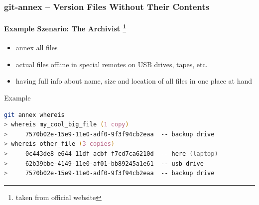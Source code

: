 \documentclass[english,hyperref={pdfpagelabels=false},aspectratio=169]{beamer}
\begin{document}
\begin{frame}[fragile]
  \frametitle{git-annex -- Version Files Without Their Contents}
  \framesubtitle{Example Szenario: The Archivist \footnote{\tiny taken from official website}}
  \begin{itemize}
    \item annex all files
    \item actual files offline in special remotes on USB drives, tapes, etc.
    \item having full info about name, size and location of all files in one place at hand
  \end{itemize}
  
  \begin{block}{Example}
    \vspace{-0.75em}
    \begin{lstlisting}[language=zsh]
git annex whereis
> whereis my_cool_big_file (1 copy)
>     7570b02e-15e9-11e0-adf0-9f3f94cb2eaa  -- backup drive
> whereis other_file (3 copies)
>     0c443de8-e644-11df-acbf-f7cd7ca6210d  -- here (laptop)
>     62b39bbe-4149-11e0-af01-bb89245a1e61  -- usb drive
>     7570b02e-15e9-11e0-adf0-9f3f94cb2eaa  -- backup drive
    \end{lstlisting}
    \vspace{-0.75em}
  \end{block}
\end{frame}




\end{document}
